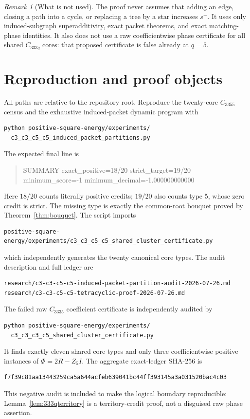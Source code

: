 \documentclass[11pt]{article}
\theoremstyle{remark}
\newtheorem{remark}[theorem]{Remark}
\begin{document}
\begin{remark}[What is not used]
The proof never assumes that adding an edge, closing a path into a cycle, or
replacing a tree by a star increases $s^+$.  It uses only induced-subgraph
superadditivity, exact packet theorems, and exact matching-phase identities.
It also does not use a raw coefficientwise phase certificate for all shared
$C_{333q}$ cores: that proposed certificate is false already at $q=5$.
\end{remark}

\appendix
\section{Reproduction and proof objects}\label{app:reproduce}

All paths are relative to the repository root.  Reproduce the twenty-core
$C_{3355}$ census and the exhaustive induced-packet dynamic program with
\begin{verbatim}
python positive-square-energy/experiments/
  c3_c3_c5_c5_induced_packet_partitions.py
\end{verbatim}
The expected final line is
\begin{quote}\ttfamily\small
SUMMARY exact\_positive=18/20 strict\_target=19/20\\
minimum\_score=-1 minimum\_decimal=-1.000000000000
\end{quote}
Here $18/20$ counts literally positive credits; $19/20$ also counts type 5,
whose zero credit is strict.  The missing type is exactly the common-root
bouquet proved by Theorem~\ref{thm:bouquet}.  The script imports
\begin{verbatim}
positive-square-energy/experiments/c3_c3_c5_c5_shared_cluster_certificate.py
\end{verbatim}
which independently generates the twenty canonical core types.  The audit
description and full ledger are
\begin{verbatim}
research/c3-c3-c5-c5-induced-packet-partition-audit-2026-07-26.md
research/c3-c3-c5-c5-tetracyclic-proof-2026-07-26.md
\end{verbatim}

The failed raw $C_{3335}$ coefficient certificate is independently audited by
\begin{verbatim}
python positive-square-energy/experiments/
  c3_c3_c3_c5_shared_cluster_certificate.py
\end{verbatim}
It finds exactly eleven shared core types and only three coefficientwise
positive instances of $\Phi=2R-Z_5I$.  The aggregate exact-ledger SHA-256 is
\begin{verbatim}
f7f39c81aa13443259ca5a644acfeb639041bc44ff393145a3a031520bac4c03
\end{verbatim}
This negative audit is included to make the logical boundary reproducible:
Lemma~\ref{lem:333qterritory} is a territory-credit proof, not a disguised raw
phase assertion.
\end{document}
